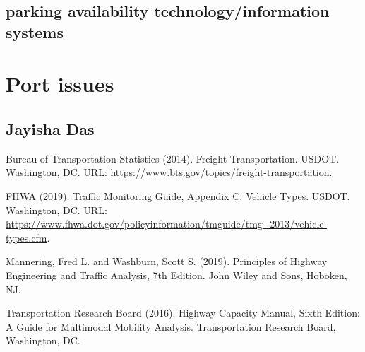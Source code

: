 \documentclass[
]{book}
\begin{document}
\hypertarget{parking-availability-technologyinformation-systems}{%
\section{parking availability technology/information systems}\label{parking-availability-technologyinformation-systems}}

\hypertarget{port-issues}{%
\chapter{Port issues}\label{port-issues}}

\hypertarget{jayisha-das}{%
\section{Jayisha Das}\label{jayisha-das}}

Bureau of Transportation Statistics (2014). Freight Transportation. USDOT. Washington, DC. URL: \url{https://www.bts.gov/topics/freight-transportation}.

FHWA (2019). Traffic Monitoring Guide, Appendix C. Vehicle Types. USDOT. Washington, DC. URL: \url{https://www.fhwa.dot.gov/policyinformation/tmguide/tmg_2013/vehicle-types.cfm}.

Mannering, Fred L. and Washburn, Scott S. (2019). Principles of Highway Engineering and Traffic Analysis, 7th Edition. John Wiley and Sons, Hoboken, NJ.

Transportation Research Board (2016). Highway Capacity Manual, Sixth Edition: A Guide for Multimodal Mobility Analysis. Transportation Research Board, Washington, DC.

  
\end{document}
